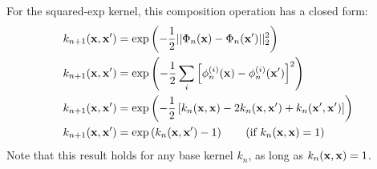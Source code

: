 \documentclass{article}
\begin{document}
For the squared-exp kernel, this composition operation has a closed form:%
%
%
%
%
%
\begin{align}
k_{n+1}({\bf{x}}, {\bf{x}}') & = \exp \left( -\frac{1}{2} || \Phi_n({\bf{x}}) - \Phi_n({\bf{x}}')||_2^2 \right) \\
k_{n+1}({\bf{x}}, {\bf{x}}') & = \exp \left( -\frac{1}{2} \sum_i \left[ \phi_n^{(i)}({\bf{x}}) - \phi_n^{(i)}({\bf{x}}') \right]^2 \right) \\
k_{n+1}({\bf{x}}, {\bf{x}}') & = \exp \left( -\frac{1}{2} \left[ k_n({\bf{x}}, {\bf{x}}) - 2 k_n({\bf{x}}, {\bf{x}}') + k_n({\bf{x}}', {\bf{x}}') \right] \right)\\
k_{n+1}({\bf{x}}, {\bf{x}}') & = \exp \left( k_n({\bf{x}}, {\bf{x}}') - 1 \right) \qquad \textnormal{(if $k_n({\bf{x}}, {\bf{x}}) = 1$)}
\end{align}
%
%
%
Note that this result holds for any base kernel $k_n$, as long as $k_n( {\bf{x}}, {\bf{x}}) = 1$.
\end{document}
